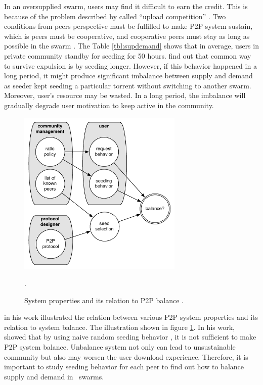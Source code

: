 In an oversupplied swarm, users may find it difficult to earn the credit. This is because of the problem described by \citeauthor{2011:managesupplydemand:meulpolder} called ``upload competition'' \cite{2011:managesupplydemand:meulpolder}. Two conditions from peers perspective must be fulfilled to make P2P system sustain, which is peers must be cooperative, and cooperative peers must stay as long as possible in the swarm \cite{2011:managesupplydemand:meulpolder}. The Table \ref{tbl:supdemand} shows that in average, users in private community standby for seeding for 50 hours. \citeauthor{2013:survivepriv:jia} find out that common way to survive expulsion is by seeding longer. However, if this behavior happened in a long period, it might produce significant imbalance between supply and demand as seeder kept seeding a particular torrent without switching to another swarm. Moreover, user's resource may be wasted. In a long period, the imbalance will gradually degrade user motivation to keep active in the community\cite{2014:sustainabilitytorrent:chen}.

\begin{figure}[h]
	\centering
	\includegraphics[width=0.7\textwidth]{pics/p2psys_balance.pdf}
	\caption{System properties and its relation to P2P balance \cite{2011:managesupplydemand:meulpolder}.}.
	\label{fig:sysbalance}
\end{figure}

\citeauthor{2011:managesupplydemand:meulpolder} in his work illustrated the relation between various P2P system properties and its relation to system balance. The illustration shown in figure \ref{fig:sysbalance}. In his work, \citeauthor{2011:managesupplydemand:meulpolder} showed that by using naive random seeding behavior , it is not sufficient to make P2P system  balance\cite{2011:managesupplydemand:meulpolder}. Unbalance system not only can lead to unsustainable community but also may worsen the user download experience. Therefore, it is important to study seeding behavior for each peer to find out how to balance supply and demand in \bt~swarms.

